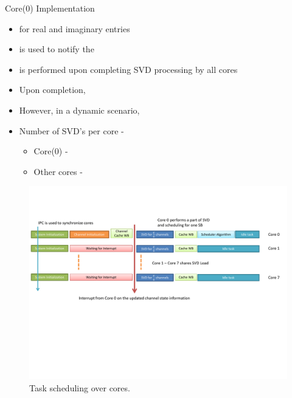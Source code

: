 \documentclass[11pt]{beamer}
\begin{document}
\begin{frame}{Core(0) Implementation}
	\begin{itemize}
		\item {} for real and imaginary entries
		\item {} is used to notify the 
		\item {} is performed upon completing SVD processing by all cores
		\item Upon completion, 
		\item However, in a dynamic scenario, 
		\item Number of SVD's per core - 
		\begin{itemize}
			\item Core(0) - 
			\item Other cores - 
		\end{itemize}
	\end{itemize}
\end{frame}

\begin{frame}
	\begin{figure}
		\centering
		\includegraphics[trim=0in 2.25in 0in 1.0in,width=\columnwidth]{overall_scheduling}
		\caption{Task scheduling over  cores.}
	\end{figure}
\end{frame}
\end{document}
